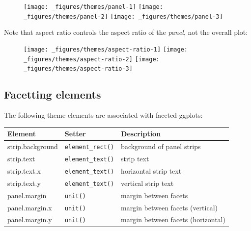 \begin{figure}[H]
  \texttt{[image: \_figures/themes/panel-1]}%
  \texttt{[image: \_figures/themes/panel-2]}%
  \texttt{[image: \_figures/themes/panel-3]}
\end{figure}

Note that aspect ratio controls the aspect ratio of the \emph{panel},
not the overall plot:

\begin{Shaded}
\begin{Highlighting}[]
\StringTok{ }\StringTok{ }\NormalTok{(} \NormalTok{(} \NormalTok{))}
\StringTok{ }\NormalTok{(}  \NormalTok{/}\StringTok{ }\NormalTok{)}
\StringTok{ }\NormalTok{(}  \NormalTok{/}\StringTok{ }\NormalTok{)}
\StringTok{ }\NormalTok{(} \NormalTok{)}
\end{Highlighting}
\end{Shaded}

\begin{figure}[H]
  \texttt{[image: \_figures/themes/aspect-ratio-1]}%
  \texttt{[image: \_figures/themes/aspect-ratio-2]}%
  \texttt{[image: \_figures/themes/aspect-ratio-3]}
\end{figure}

\subsection{Facetting elements}

 

The following theme elements are associated with faceted ggplots:

\begin{longtable}[c]{@{}lll@{}}
\toprule
Element & Setter & Description\tabularnewline
\midrule
\endhead
strip.background & \texttt{element\_rect()} & background of panel
strips\tabularnewline
strip.text & \texttt{element\_text()} & strip text\tabularnewline
strip.text.x & \texttt{element\_text()} & horizontal strip
text\tabularnewline
strip.text.y & \texttt{element\_text()} & vertical strip
text\tabularnewline
panel.margin & \texttt{unit()} & margin between facets\tabularnewline
panel.margin.x & \texttt{unit()} & margin between facets
(vertical)\tabularnewline
panel.margin.y & \texttt{unit()} & margin between facets
(horizontal)\tabularnewline
\bottomrule
\end{longtable}

